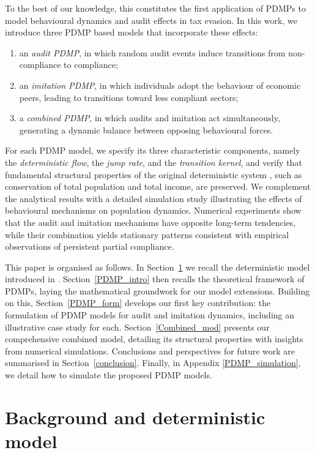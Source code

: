\documentclass[11pt]{article}
\theoremstyle{plain}
\theoremstyle{definition}
\newcommand{\1}{\mathbf{1}}
\begin{document}
To the best of our knowledge, this constitutes the first application of PDMPs to model behavioural dynamics and audit effects in tax evasion.  In this work, we introduce three PDMP based models that incorporate these effects:
\begin{enumerate}
    \item an \emph{audit PDMP}, in which random audit events induce transitions from
          non-compliance to compliance;
    \item an \emph{imitation PDMP}, in which individuals adopt the behaviour of economic
          peers, leading to transitions toward less compliant sectors;
    \item a \emph{combined PDMP}, in which audits and imitation act simultaneously,
          generating a dynamic balance between opposing behavioural forces.
\end{enumerate}
For each PDMP model, we specify its three characteristic components, namely the \textit{deterministic flow}, the \textit{jump rate}, and the \textit{transition kernel}, and
verify that fundamental structural properties of the original deterministic system \cite{bertotti2018mathematical}, such as conservation of total population and total income, are preserved. 
We complement the analytical results with a detailed simulation study illustrating the effects of behavioural mechanisms on population dynamics. Numerical experiments show that the audit and imitation mechanisms have opposite long-term tendencies, while their combination yields stationary patterns consistent with empirical observations of persistent partial compliance.

This paper is organised as follows. In Section~\ref{Back_sec} we recall the deterministic model introduced in \cite{bertotti2018mathematical}. Section~\ref{PDMP_intro} then recalls the theoretical framework of PDMPs, laying the mathematical groundwork for our model extensions. Building on this, Section~\ref{PDMP_form} develops our first key contribution: the formulation of PDMP models for audit and imitation dynamics, including an illustrative case study for each. Section~\ref{Combined_mod} presents our comprehensive combined model, detailing its structural properties with insights from numerical simulations. Conclusions and perspectives for
future work are summarised in Section~\ref{conclusion}. Finally, in Appendix \ref{PDMP_simulation}, we detail how to simulate the proposed PDMP models.


\section{Background and deterministic model}
\label{Back_sec}
\end{document}
